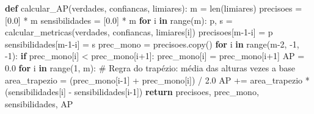 \documentclass[
  portuguese,
  letterpaper,
  openany,
  oneside,
  12pt,
  a4paper]{book}
\newenvironment{Shaded}{\begin{snugshade}}{\end{snugshade}}
\newcommand{\BuiltInTok}[1]{\textcolor[rgb]{0.00,0.23,0.31}{#1}}
\newcommand{\CommentTok}[1]{\textcolor[rgb]{0.37,0.37,0.37}{#1}}
\newcommand{\ControlFlowTok}[1]{\textcolor[rgb]{0.00,0.23,0.31}{\textbf{#1}}}
\newcommand{\DecValTok}[1]{\textcolor[rgb]{0.68,0.00,0.00}{#1}}
\newcommand{\FloatTok}[1]{\textcolor[rgb]{0.68,0.00,0.00}{#1}}
\newcommand{\KeywordTok}[1]{\textcolor[rgb]{0.00,0.23,0.31}{\textbf{#1}}}
\newcommand{\NormalTok}[1]{\textcolor[rgb]{0.00,0.23,0.31}{#1}}
\newcommand{\OperatorTok}[1]{\textcolor[rgb]{0.37,0.37,0.37}{#1}}
\begin{document}
\begin{Shaded}
\begin{Highlighting}[]
\KeywordTok{def}\NormalTok{ calcular\_AP(verdades, confiancas, limiares):}
\NormalTok{    m }\OperatorTok{=} \BuiltInTok{len}\NormalTok{(limiares)}
\NormalTok{    precisoes }\OperatorTok{=}\NormalTok{ [}\FloatTok{0.0}\NormalTok{] }\OperatorTok{*}\NormalTok{ m}
\NormalTok{    sensibilidades }\OperatorTok{=}\NormalTok{ [}\FloatTok{0.0}\NormalTok{] }\OperatorTok{*}\NormalTok{ m}
    \ControlFlowTok{for}\NormalTok{ i }\KeywordTok{in} \BuiltInTok{range}\NormalTok{(m):}
\NormalTok{        p, s }\OperatorTok{=}\NormalTok{ calcular\_metricas(verdades, confiancas, limiares[i])}
\NormalTok{        precisoes[m}\OperatorTok{{-}}\DecValTok{1}\OperatorTok{{-}}\NormalTok{i] }\OperatorTok{=}\NormalTok{ p}
\NormalTok{        sensibilidades[m}\OperatorTok{{-}}\DecValTok{1}\OperatorTok{{-}}\NormalTok{i] }\OperatorTok{=}\NormalTok{ s}
\NormalTok{    prec\_mono }\OperatorTok{=}\NormalTok{ precisoes.copy()}
    \ControlFlowTok{for}\NormalTok{ i }\KeywordTok{in} \BuiltInTok{range}\NormalTok{(m}\OperatorTok{{-}}\DecValTok{2}\NormalTok{, }\OperatorTok{{-}}\DecValTok{1}\NormalTok{, }\OperatorTok{{-}}\DecValTok{1}\NormalTok{):}
        \ControlFlowTok{if}\NormalTok{ prec\_mono[i] }\OperatorTok{\textless{}}\NormalTok{ prec\_mono[i}\OperatorTok{+}\DecValTok{1}\NormalTok{]:}
\NormalTok{            prec\_mono[i] }\OperatorTok{=}\NormalTok{ prec\_mono[i}\OperatorTok{+}\DecValTok{1}\NormalTok{]}
\NormalTok{    AP }\OperatorTok{=} \FloatTok{0.0}
    \ControlFlowTok{for}\NormalTok{ i }\KeywordTok{in} \BuiltInTok{range}\NormalTok{(}\DecValTok{1}\NormalTok{, m):}
        \CommentTok{\# Regra do trapézio: média das alturas vezes a base}
\NormalTok{        area\_trapezio }\OperatorTok{=}\NormalTok{ (prec\_mono[i}\OperatorTok{{-}}\DecValTok{1}\NormalTok{] }\OperatorTok{+}\NormalTok{ prec\_mono[i]) }\OperatorTok{/} \FloatTok{2.0}
\NormalTok{        AP }\OperatorTok{+=}\NormalTok{ area\_trapezio }\OperatorTok{*}\NormalTok{ (sensibilidades[i] }\OperatorTok{{-}}\NormalTok{ sensibilidades[i}\OperatorTok{{-}}\DecValTok{1}\NormalTok{])}
    \ControlFlowTok{return}\NormalTok{ precisoes, prec\_mono, sensibilidades, AP}
\end{Highlighting}
\end{Shaded}
\end{document}
